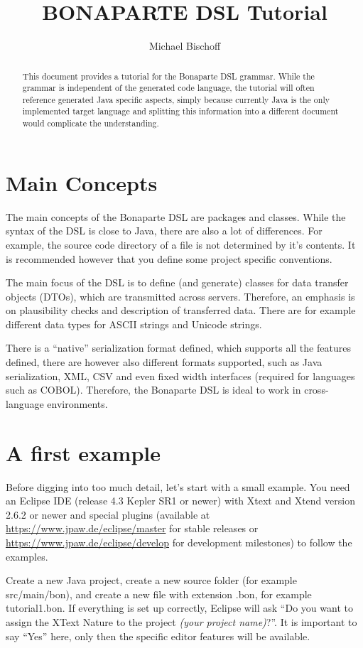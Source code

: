 \documentclass[11pt,a4paper,oneside]{article}
\title{BONAPARTE DSL Tutorial}
\author{Michael Bischoff}
\begin{document}
\maketitle
\begin{abstract}
This document provides a tutorial for the Bonaparte DSL grammar. While the grammar is independent of the generated code language,
the tutorial will often reference generated Java specific aspects, simply because currently Java is the only implemented target language
and splitting this information into a different document would complicate the understanding.
\end{abstract}

\section{Main Concepts}
The main concepts of the Bonaparte DSL are packages and classes. While the syntax of the DSL is close to Java, there are also a lot of differences.
For example, the source code directory of a file is not determined by it's contents. It is recommended however that you define some project specific
conventions.

The main focus of the DSL is to define (and generate) classes for data transfer objects (DTOs), which are transmitted across servers.
Therefore, an emphasis is on plausibility checks and description of transferred data. There are for example different data types for ASCII strings
and Unicode strings.

There is a ``native'' serialization format defined, which supports all the features defined, there are however also different formats supported,
such as Java serialization, XML, CSV and even fixed width interfaces (required for languages such as COBOL). Therefore, the Bonaparte DSL
is ideal to work in cross-language environments.


\section{A first example}
Before digging into too much detail, let's start with a small example.  You need an Eclipse IDE (release 4.3 Kepler SR1 or
newer) with Xtext and Xtend version 2.6.2 or newer and special plugins (available at \url{https://www.jpaw.de/eclipse/master}
for stable releases or \url{https://www.jpaw.de/eclipse/develop} for development milestones) to follow the examples.

Create a new Java project, create a new source folder (for example {\ttfamily src/main/bon}), and create a new file with extension {\ttfamily .bon},
for example {\ttfamily tutorial1.bon}. If everything is set up correctly, Eclipse will ask ``Do you want to assign the XText
Nature to the project {\it{ (your project name)}}?''.
It is important to say ``Yes'' here, only then the specific editor features will be available.
\end{document}
